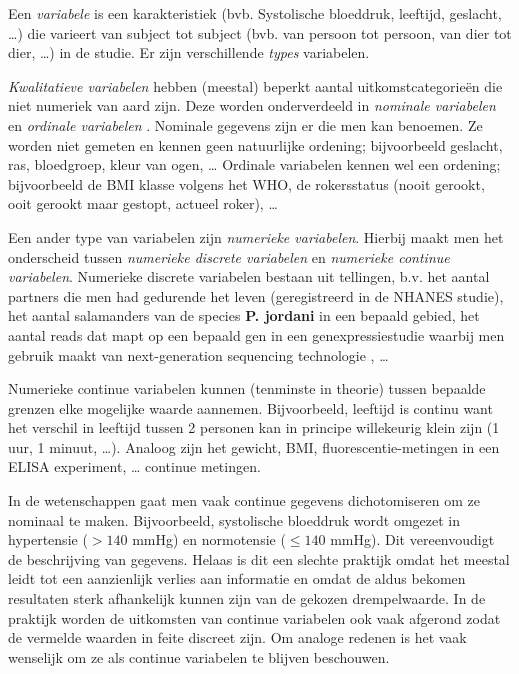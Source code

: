\documentclass[
  12pt,dutch,coursenotes]{book}
\begin{document}
Een \emph{variabele} is een karakteristiek (bvb. Systolische bloeddruk, leeftijd, geslacht, \ldots)
die varieert van subject tot subject (bvb. van persoon tot persoon, van dier tot dier, \ldots) in de studie.
Er zijn verschillende \emph{types} variabelen.

\emph{Kwalitatieve variabelen} hebben (meestal) beperkt aantal
uitkomstcategorieën die niet numeriek van aard zijn. Deze worden
onderverdeeld in \emph{nominale variabelen} en \emph{ordinale variabelen}
. Nominale gegevens zijn er die men kan benoemen. Ze worden niet gemeten en kennen geen natuurlijke ordening; bijvoorbeeld geslacht, ras,
bloedgroep, kleur van ogen, \ldots{}
Ordinale variabelen kennen wel een ordening; bijvoorbeeld de BMI klasse volgens het WHO, de rokersstatus (nooit gerookt, ooit gerookt maar
gestopt, actueel roker), \ldots{}

Een ander type van variabelen zijn \emph{numerieke variabelen}. Hierbij maakt men het onderscheid tussen \emph{numerieke discrete variabelen} en \emph{numerieke continue variabelen}.
Numerieke discrete variabelen bestaan uit tellingen, b.v. het aantal partners die men had gedurende het leven (geregistreerd in de NHANES studie), het aantal salamanders van de species \textbf{P. jordani} in een bepaald gebied, het aantal reads dat mapt op een bepaald gen in een genexpressiestudie waarbij men gebruik maakt van next-generation sequencing technologie , \ldots{}

Numerieke continue variabelen kunnen (tenminste in theorie) tussen bepaalde grenzen elke mogelijke waarde aannemen. Bijvoorbeeld, leeftijd is continu want het verschil in leeftijd tussen 2 personen kan in principe willekeurig klein zijn (1 uur, 1 minuut, \ldots). Analoog zijn het gewicht, BMI, fluorescentie-metingen in een ELISA experiment, \ldots{} continue metingen.

In de wetenschappen gaat men vaak continue
gegevens dichotomiseren om ze nominaal te maken. Bijvoorbeeld, systolische
bloeddruk wordt omgezet in hypertensie (\(>140\) mmHg) en normotensie (\(\leq 140\)
mmHg). Dit vereenvoudigt de beschrijving van gegevens. Helaas is dit een
slechte praktijk omdat het meestal leidt tot een aanzienlijk verlies aan informatie en
omdat de aldus bekomen resultaten sterk afhankelijk kunnen zijn van de
gekozen drempelwaarde. In de praktijk worden de uitkomsten van continue
variabelen ook vaak afgerond zodat de vermelde waarden in feite discreet
zijn. Om analoge redenen is het vaak wenselijk om ze als continue variabelen
te blijven beschouwen.
\end{document}
